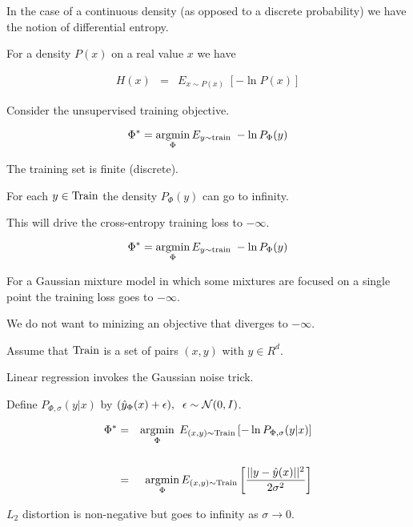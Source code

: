 {\vfill


In the case of a continuous density (as opposed to a discrete probability) we have the notion of differential entropy.

\vfill
For a density $P(x)$ on a real value $x$ we have

\vfill
\begin{eqnarray*}
H(x) & = & E_{x \sim P(x)}\;\left[-\ln P(x)\right]
\end{eqnarray*}


Consider the unsupervised training objective.

$$\Phi^* = \operatorname*{argmin}_{\Phi} E_{y \sim \mathrm{train}}\;-\ln P_\Phi(y)$$

\vfill
The training set is finite (discrete).

\vfill
For each $y \in \mathrm{Train}$ the density $P_\Phi(y)$ can go to infinity.

\vfill
This will drive the cross-entropy training loss to $-\infty$.


$$\Phi^* = \operatorname*{argmin}_{\Phi} E_{y \sim \mathrm{train}}\;-\ln P_\Phi(y)$$

\vfill
For a Gaussian mixture model in which some mixtures are focused on a single point
the training loss goes to $-\infty$.

\vfill
We do not want to minizing an objective that diverges to $-\infty$.


Assume that $\mathrm{Train}$ is a set of pairs $(x,y)$ with $y \in R^d$.

\vfill
Linear regression invokes the Gaussian noise trick.

\vfill
Define $P_{\Phi,\sigma}(y|x)$ by
$(\hat{y}_\Phi(x) + \epsilon),\;\; \epsilon \sim {\cal N}(0,I)$.

{\huge
\begin{eqnarray*}
\Phi^* & = & \operatorname*{argmin}_{\Phi}\;E_{(x,y)\sim \mathrm{Train}}\left[-\ln P_{\Phi,\sigma}(y|x)\right] \\
\\
& = & \operatorname*{argmin}_\Phi E_{(x,y)\sim \mathrm{Train}} \left[\frac{||y - \hat{y}(x)||^2}{2\sigma^2}\right]
\end{eqnarray*}
}

$L_2$ distortion is non-negative but goes to infinity as $\sigma \rightarrow 0$.

}
